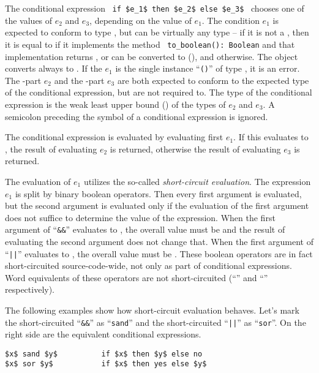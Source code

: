 The conditional expression ~\lstinline!if $e_1$ then $e_2$ else $e_3$!~ chooses one of the values of $e_2$ and $e_3$, depending on the value of $e_1$. The condition $e_1$ is expected to conform to type , but can be virtually any type -- if it is not a , then it is equal to  if it implements the method ~\lstinline!to_boolean(): Boolean! and that implementation returns , or can be converted to  (), and  otherwise. The  object converts always to . If the $e_1$ is the single instance ``\lstinline!()!'' of type , it is an error. The -part $e_2$ and the -part $e_3$ are both expected to conform to the expected type of the conditional expression, but are not required to. The type of the conditional expression is the weak least upper bound () of the types of $e_2$ and $e_3$. A semicolon preceding the  symbol of a conditional expression is ignored. 

The conditional expression is evaluated by evaluating first $e_1$. If this evaluates to , the result of evaluating $e_2$ is returned, otherwise the result of evaluating $e_3$ is returned. 

The evaluation of $e_1$ utilizes the so-called {\em short-circuit evaluation}. The expression $e_1$ is split by binary boolean operators. Then every first argument is evaluated, but the second argument is evaluated only if the evaluation of the first argument does not suffice to determine the value of the expression. When the first argument of ``\lstinline!&&!'' evaluates to , the overall value must be  and the result of evaluating the second argument does not change that. When the first argument of ``\lstinline!||!'' evaluates to , the overall value must be . These boolean operators are in fact short-circuited source-code-wide, not only as part of conditional expressions. Word equivalents of these operators are not short-circuited (``'' and ``'' respectively). 

\example The following examples show how short-circuit evaluation behaves. Let's mark the short-circuited ``\lstinline!&&!'' as ``\lstinline!sand!'' and the short-circuited ``\lstinline!||!'' as ``\lstinline!sor!''. On the right side are the equivalent conditional expressions. 
\begin{lstlisting}
$x$ sand $y$          if $x$ then $y$ else no
$x$ sor $y$           if $x$ then yes else $y$
\end{lstlisting}

